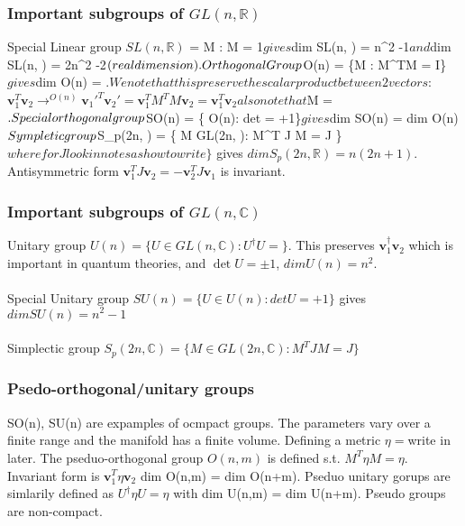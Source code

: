 \documentclass{article}
\begin{document}
{\subsubsection{Important subgroups of $GL(n, \mathbb{R})$}
Special Linear group $SL(n, \mathbb{R})$ = {M : \det M = 1}$ gives $dim SL(n, ) = n^2 -1$ and $dim SL(n, ) = 2n^2 -2$ (real dimension). \\\\
Orthogonal Group $O(n) = \{M : M^TM = I\}$ gives $dim O(n) = $. We note that this preserve the scalar product between 2 vectors:
$$
\bm v_1^T \bm v_2 \rightarrow^{O(n)} \bm v_1'^T \bm v_2' = \bm v_1^TM^T M\bm v_2 = \bm v_1^T \bm v_2  
$$
also note that $\det M = $.\\\\
Special orthogonal group $SO(n) = \{ \in O(n): det  = +1\}$ gives $dim SO(n) = dim O(n)$\\\\
Sympletic group $S_p(2n, ) = \{ M \in GL(2n, ): M^T J M = J \}$ where for J look in notes as how to write\}$ gives $dim S_p(2n, \mathbb{R}) = n(2n+1)$. Antisymmetric form $\bm v_1^T J \bm v_2 = -  \bm v_2^T J \bm v_1$ is invariant.
\subsubsection{Important subgroups of $GL(n, \mathbb{C})$}
Unitary group $U(n) = \{U \in GL(n, \mathbb{C}) : U^{\dagger}U = \}$. This preserves $\bm v_1^{\dagger} \bm v_2$ which is important in quantum theories, and $\det U = \pm 1$, $dim U(n) = n^2$.\\\\
Special Unitary group $SU(n) = \{ U \in U(n): det U = +1\}$ gives $dim SU(n) = n^2 -1$\\\\
Simplectic group $S_p(2n, \mathbb{C}) = \{ M \in GL(2n, \mathbb{C}): M^T J M = J \}$
\subsubsection{Psedo-orthogonal/unitary groups}
SO(n), SU(n) are expamples of ocmpact groups. The parameters vary over a finite range and the manifold has a finite volume. Defining a metric $\eta = $write in later. The pseduo-orthogonal group $O(n,m)$ is defined s.t. $M^T\eta M = \eta$. Invariant form is $\bm v_1^T \eta \bm v_2$ dim O(n,m) = dim O(n+m). Pseduo unitary gorups are simlarily defined as $U^{\dagger}\eta U = \eta$ with dim U(n,m) = dim U(n+m). Pseudo groups are non-compact.
}
\end{document}
